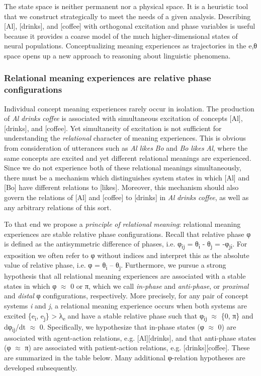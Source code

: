   The state space is neither permanent nor a physical space. It is a heuristic tool that we construct strategically to meet the needs of a given analysis. Describing [Al], [drinks], and [coffee] with orthogonal excitation and phase variables is useful because it provides a coarse model of the much higher-dimensional states of neural populations. Conceptualizing meaning experiences as trajectories in the e,θ space opens up a new approach to reasoning about linguistic phenomena.

\subsubsection{Relational meaning experiences are relative phase configurations}

Individual concept meaning experiences rarely occur in isolation. The production of \textit{Al} \textit{drinks} \textit{coffee} is associated with simultaneous excitation of concepts [Al], [drinks], and [coffee]. Yet simultaneity of excitation is not sufficient for understanding the \textit{relational} character of meaning experiences. This is obvious from consideration of utterances such as \textit{Al} \textit{likes} \textit{Bo} and \textit{Bo} \textit{likes} \textit{Al}, where the same concepts are excited and yet different relational meanings are experienced. Since we do not experience both of these relational meanings simultaneously, there must be a mechanism which distinguishes system states in which [Al] and [Bo] have different relations to [likes]. Moreover, this mechanism should also govern the relations of [Al] and [coffee] to [drinks] in \textit{Al} \textit{drinks} \textit{coffee}, as well as any arbitrary relations of this sort. 

  To that end we propose a \textit{principle} \textit{of} \textit{relational} \textit{meaning}: relational meaning experiences are stable relative phase configurations. Recall that relative phase φ is defined as the antisymmetric difference of phases, i.e. φ\textsubscript{ij} = θ\textsubscript{i} - θ\textsubscript{j} = -φ\textsubscript{ji}. For exposition we often refer to φ without indices and interpret this as the absolute value of relative phase, i.e. {\textbar}φ{\textbar} = {\textbar}θ\textsubscript{i} – θ\textsubscript{j}{\textbar}. Furthermore, we pursue a strong hypothesis that all relational meaning experiences are associated with a stable states in which φ ${\approx}$ 0 or π, which we call \textit{in-phase} and \textit{anti-phase}, or \textit{proximal} and \textit{distal} φ configurations, respectively. More precisely, for any pair of concept systems \textit{i} and \textit{j}, a relational meaning experience occurs when both systems are excited \{e\textsubscript{i}, e\textsubscript{j}\} > λ\textsubscript{e} and have a stable relative phase such that {\textbar}φ\textsubscript{ij}{\textbar} ${\approx}$ \{0, π\} and dφ\textsubscript{ij}/dt ${\approx}$ 0. Specifically, we hypothesize that in-phase states (φ ${\approx}$ 0) are associated with agent-action relations, e.g. [Al][drinks], and that anti-phase states (φ ${\approx}$ π) are associated with patient-action relations, e.g. [drinks][coffee]. These are summarized in the table below. Many additional φ-relation hypotheses are developed subsequently.

